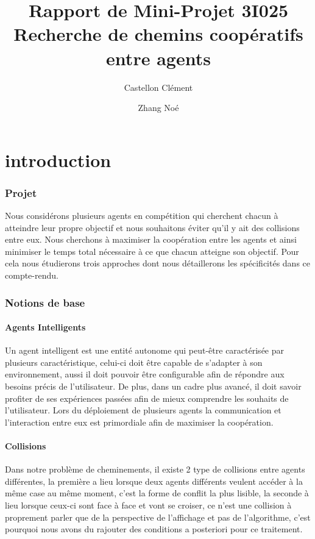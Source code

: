 \documentclass{article}
\begin{document}
	
	\title{Rapport de Mini-Projet 3I025 \\
		\large Recherche de chemins coopératifs entre agents}
	\author{Castellon Clément \and Zhang Noé}
	\maketitle
	
	\part{introduction}
	
		\section{Projet}
		
			Nous considérons plusieurs agents en compétition qui cherchent chacun à atteindre leur propre objectif et nous souhaitons éviter qu'il y ait des collisions entre eux.
			Nous cherchons à maximiser la coopération entre les agents et ainsi minimiser le temps total nécessaire à ce que chacun atteigne son objectif.
			Pour cela nous étudierons trois approches dont nous détaillerons les spécificités dans ce compte-rendu.
			
			
		\section{Notions de base}
	
			\subsection{Agents Intelligents}
			Un agent intelligent est une entité autonome qui peut-être caractérisée par plusieurs caractéristique, celui-ci doit être capable de s'adapter à son environnement, aussi il doit pouvoir être configurable afin de répondre aux besoins précis de l'utilisateur. De plus, dans un cadre plus avancé, il doit savoir profiter de ses expériences passées afin de mieux comprendre les souhaits de l'utilisateur. Lors du déploiement de plusieurs agents la communication et l'interaction entre eux est primordiale afin de maximiser la coopération. %
			
			\subsection{Collisions}
				Dans notre problème de cheminements, il existe 2 type de collisions entre agents différentes, la première a lieu lorsque deux agents différents veulent accéder à la même case au même moment, c'est la forme de conflit la plus lisible, la seconde à lieu lorsque ceux-ci sont face à face et vont se croiser, ce n'est une collision à proprement parler que de la perspective de l'affichage et pas de l'algorithme, c'est pourquoi nous avons du rajouter des conditions a posteriori pour ce traitement.
			
\end{document}
